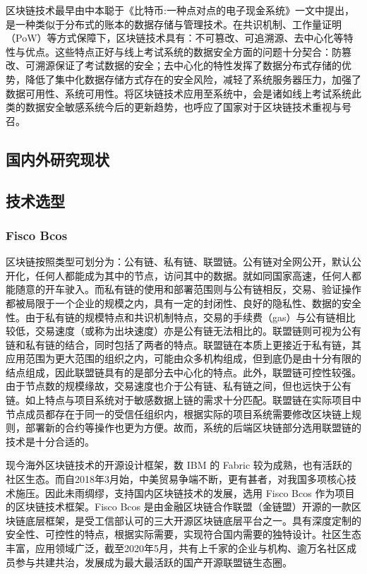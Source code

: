 区块链技术最早由中本聪于《比特币:一种点对点的电子现金系统》一文中提出，是一种类似于分布式的账本的数据存储与管理技术。在共识机制、工作量证明（PoW）等方式保障下，区块链技术具有：不可篡改、可追溯源、去中心化等特性与优点。这些特点正好与线上考试系统的数据安全方面的问题十分契合：防篡改、可溯源保证了考试数据的安全；去中心化的特性发挥了数据分布式存储的优势，降低了集中化数据存储方式存在的安全风险，减轻了系统服务器压力，加强了数据可用性、系统可用性。将区块链技术应用至系统中，会是诸如线上考试系统此类的数据安全敏感系统今后的更新趋势，也呼应了国家对于区块链技术重视与号召。

\subsection{国内外研究现状}

\subsection{技术选型}
\subsubsection{Fisco Bcos}
区块链按照类型可划分为：公有链、私有链、联盟链。公有链对全网公开，默认公开化，任何人都能成为其中的节点，访问其中的数据。就如同国家高速，任何人都能随意的开车驶入。而私有链的使用和部署范围则与公有链相反，交易、验证操作都被局限于一个企业的规模之内，具有一定的封闭性、良好的隐私性、数据的安全性。由于私有链的规模特点和共识机制特点，交易的手续费（gas）与公有链相比较低，交易速度（或称为出块速度）亦是公有链无法相比的。联盟链则可视为公有链和私有链的结合，同时包括了两者的特点。联盟链在本质上更接近于私有链，其应用范围为更大范围的组织之内，可能由众多机构组成，但到底仍是由十分有限的结点组成，因此联盟链具有的是部分去中心化的特点。此外，联盟链可控性较强。由于节点数的规模缘故，交易速度也介于公有链、私有链之间，但也远快于公有链。如上特点与项目系统对于敏感数据上链的需求十分匹配。联盟链在实际项目中节点成员都存在于同一的受信任组织内，根据实际的项目系统需要修改区块链上规则，部署新的合约等操作也更为方便。故而，系统的后端区块链部分选用联盟链的技术是十分合适的。

现今海外区块链技术的开源设计框架，数 IBM 的 Fabric 较为成熟，也有活跃的社区生态。而自2018年3月始，中美贸易争端不断，更有甚者，对我国多项核心技术施压。因此未雨绸缪，支持国内区块链技术的发展，选用 Fisco Bcos 作为项目的区块链技术框架。Fisco Bcos 是由金融区块链合作联盟（金链盟）开源的一款区块链底层框架，是受工信部认可的三大开源区块链底层平台之一。具有深度定制的安全性、可控性的特点，根据实际需要，实现符合国内需要的独特设计。社区生态丰富，应用领域广泛，截至2020年5月，共有上千家的企业与机构、逾万名社区成员参与共建共治，发展成为最大最活跃的国产开源联盟链生态圈。

